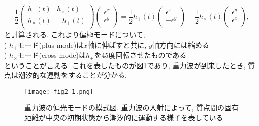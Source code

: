 \begin{equation}
\frac{1}{2}
\begin{pmatrix}
h_{+}(t) & h_{\times}(t) \\
h_{\times}(t) & -h_{+}(t) \\
\end{pmatrix}
\begin{pmatrix}
\epsilon^x \\
\epsilon^y \\
\end{pmatrix}
=\frac{1}{2}h_{+}(t)
\begin{pmatrix}
\epsilon^x \\
-\epsilon^y \\
\end{pmatrix}
+\frac{1}{2}h_{\times}(t)
\begin{pmatrix}
\epsilon^y \\
\epsilon^x \\
\end{pmatrix},
\end{equation}
と計算される. これより偏極モードについて, \\
) $h_{+}$モード(plus mode)は$x$軸に伸ばすと共に, $y$軸方向には縮める\\
) $h_{\times}$モード(cross mode)は$h_{+}$を45度回転させたものである\\
ということが言える. これを表したものが図\ref{fig2.1}であり, 重力波が到来したとき, 質点は潮汐的な運動をすることが分かる. 
\begin{figure}[H]
\begin{center}
\texttt{[image: fig2\_1.png]}
\caption[重力波の偏光モード]{重力波の偏光モードの模式図. 重力波の入射によって, 質点間の固有距離が中央の初期状態から潮汐的に運動する様子を表している}
\label{fig2.1}
\end{center}
\end{figure}
